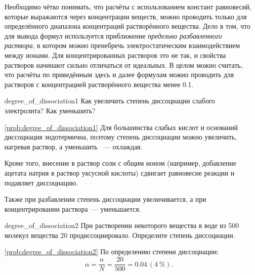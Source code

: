 Необходимо чётко понимать, что расчёты с использованием констант равновесий, которые выражаются через концентрации веществ, можно проводить только для определённого диапазона концентраций растворённого вещества. Дело в том, что для вывода формул используется приближение \emph{предельно разбавленного раствора}, в котором можно пренебречь электростатическим взаимодействием между ионами. Для концентрированных растворов это не так, и свойства растворов начинают сильно отличаться от идеальных. В целом можно считать, что расчёты по приведённым здесь и далее формулам можно проводить для растворов с концентрацией растворённого вещества менее \qty{0,1}{\ruMolar}.

\begin{problem}{}{degree_of_dissociation1}
    Как увеличить степень диссоциации слабого электролита? Как уменьшить?
    \begin{sol}{\ref{prob:degree_of_dissociation1}}
        Для большинства слабых кислот и оснований диссоциация эндотермична, поэтому степень диссоциации можно увеличить, нагревая раствор, а уменьшить ~--- охлаждая.

        Кроме того, внесение в раствор соли с общим ионом (например, добавление ацетата натрия в раствор уксусной кислоты) сдвигает равновесие реакции и подавляет диссоциацию.

        Также при разбавлении степень диссоциации увеличивается, а при концентрировании раствора~--- уменьшается.
    \end{sol}
\end{problem}

\begin{problem}{}{degree_of_dissociation2}
    При растворении некоторого вещества в воде из 500 молекул вещества 20 продиссоциировало. Определите степень диссоциации.
    \begin{sol}{\ref{prob:degree_of_dissociation2}}
        По определению степени диссоциации:
        \begin{equation*}
            \alpha = \frac{n}{N} = \frac{20}{500} = \num{0,04} \, (\qty{4}{\percent}).
        \end{equation*}
    \end{sol}
\end{problem}

